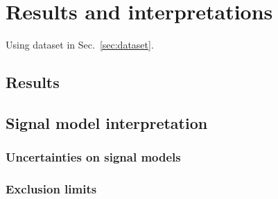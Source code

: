 \chapter{Results and interpretations}
\label{chap:results}

Using dataset in Sec.~\ref{sec:dataset}.


\section{Results}





\section{Signal model interpretation}
\label{sec:signalModel}



\subsection{Uncertainties on signal models}


\subsection{Exclusion limits}


